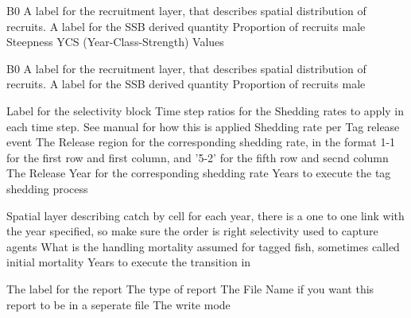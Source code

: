 \par\textbf{}\par
{} {B0}
 {A label for the recruitment layer, that describes spatial distribution of recruits.}
 {A label for the SSB derived quantity}
 {Proportion of recruits male}
 {}
 {}
 {Steepness}
 {YCS (Year-Class-Strength) Values}
\par\textbf{}\par
{} {B0}
 {A label for the recruitment layer, that describes spatial distribution of recruits.}
 {A label for the SSB derived quantity}
 {Proportion of recruits male}
 {}
 {}
\par\textbf{}\par
{} {Label for the selectivity block}
 {Time step ratios for the Shedding rates to apply in each time step. See manual for how this is applied}
 {Shedding rate per Tag release event}
 {The Release region for the corresponding shedding rate, in the format 1-1 for the first row and first column, and '5-2' for the fifth row and secnd column}
 {The Release Year for the corresponding shedding rate}
 {Years to execute the tag shedding process}
\par\textbf{}\par
{} {Spatial layer describing catch by cell for each year, there is a one to one link with the year specified, so make sure the order is right}
 {selectivity used to capture agents}
 {What is the handling mortality assumed for tagged fish, sometimes called initial mortality}
 {Years to execute the transition in}
\par\par
{} {The label for the report}
 {The type of report}
 {The File Name if you want this report to be in a seperate file}
 {The write mode}
\par\textbf{}\par
